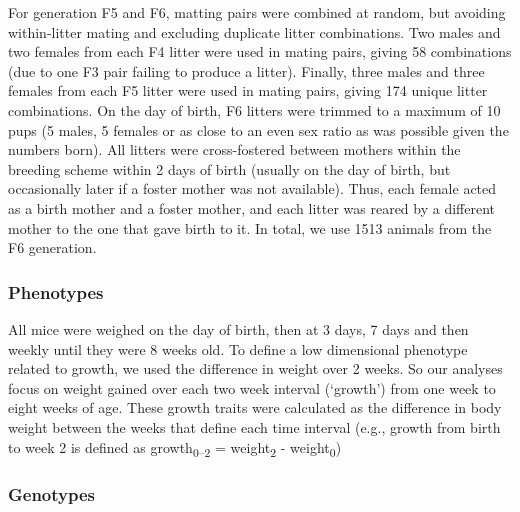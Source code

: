 \begin{refsection}
For generation F5 and F6, matting pairs were combined at random, but avoiding within-litter mating and excluding duplicate litter combinations. Two males and two females from each F4 litter were used in mating pairs, giving 58 combinations (due to one F3 pair failing to produce a litter). Finally, three males and three females from each F5 litter were used in mating pairs, giving 174 unique litter combinations. On the day of birth, F6 litters were trimmed to a maximum of 10 pups (5 males, 5 females or as close to an even sex ratio as was possible given the numbers born).  All litters were cross-fostered between mothers within the breeding scheme within 2 days of birth (usually on the day of birth, but occasionally later if a foster mother was not available).  Thus, each female acted as a birth mother and a foster mother, and each litter was reared by a different mother to the one that gave birth to it. In total, we use 1513 animals from the F6 generation.

\subsubsection{Phenotypes}

All mice were weighed on the day of birth, then at 3 days, 7 days and then weekly until they were 8 weeks old. To define a low dimensional phenotype related to growth, we used the difference in weight over 2 weeks. So our analyses focus on weight gained over each two week interval (`growth') from one week to
eight weeks of age. These growth traits were calculated as the difference in body weight between the weeks that define each time interval (e.g., growth from birth to week 2 is defined as growth\textsubscript{0--2} = weight\textsubscript{2}
- weight\textsubscript{0})
 
\subsubsection{Genotypes}


\end{refsection}
